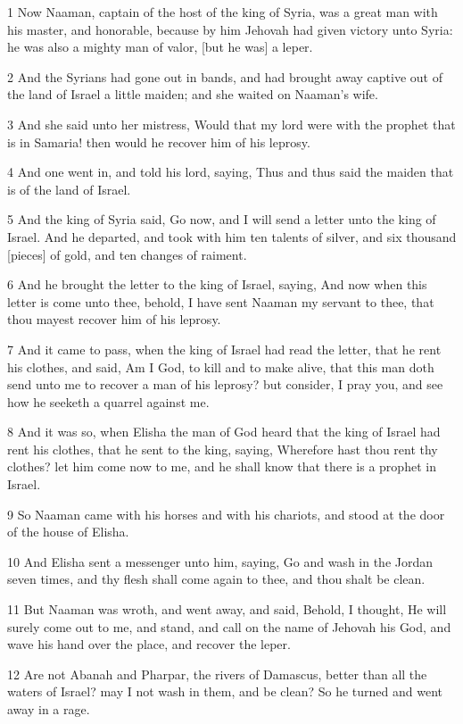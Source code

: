 \par 1 Now Naaman, captain of the host of the king of Syria, was a great man with his master, and honorable, because by him Jehovah had given victory unto Syria: he was also a mighty man of valor, [but he was] a leper.
\par 2 And the Syrians had gone out in bands, and had brought away captive out of the land of Israel a little maiden; and she waited on Naaman's wife.
\par 3 And she said unto her mistress, Would that my lord were with the prophet that is in Samaria! then would he recover him of his leprosy.
\par 4 And one went in, and told his lord, saying, Thus and thus said the maiden that is of the land of Israel.
\par 5 And the king of Syria said, Go now, and I will send a letter unto the king of Israel. And he departed, and took with him ten talents of silver, and six thousand [pieces] of gold, and ten changes of raiment.
\par 6 And he brought the letter to the king of Israel, saying, And now when this letter is come unto thee, behold, I have sent Naaman my servant to thee, that thou mayest recover him of his leprosy.
\par 7 And it came to pass, when the king of Israel had read the letter, that he rent his clothes, and said, Am I God, to kill and to make alive, that this man doth send unto me to recover a man of his leprosy? but consider, I pray you, and see how he seeketh a quarrel against me.
\par 8 And it was so, when Elisha the man of God heard that the king of Israel had rent his clothes, that he sent to the king, saying, Wherefore hast thou rent thy clothes? let him come now to me, and he shall know that there is a prophet in Israel.
\par 9 So Naaman came with his horses and with his chariots, and stood at the door of the house of Elisha.
\par 10 And Elisha sent a messenger unto him, saying, Go and wash in the Jordan seven times, and thy flesh shall come again to thee, and thou shalt be clean.
\par 11 But Naaman was wroth, and went away, and said, Behold, I thought, He will surely come out to me, and stand, and call on the name of Jehovah his God, and wave his hand over the place, and recover the leper.
\par 12 Are not Abanah and Pharpar, the rivers of Damascus, better than all the waters of Israel? may I not wash in them, and be clean? So he turned and went away in a rage.
